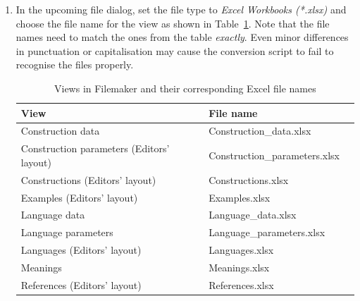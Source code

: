 \documentclass[12pt,a4paper]{scrartcl}
\begin{document}
\begin{enumerate}
    \newpage
  \item
    In the upcoming file dialog, set the file type to \emph{Excel Workbooks
    (*.xlsx)} and choose the file name for the view as shown in
    Table~\ref{tab:filenames}.
    Note that the file names need to match the ones from the table
    \emph{exactly}.
    Even minor differences in punctuation or capitalisation may cause the
    conversion script to fail to recognise the files properly.\\[1ex]{}

    \begin{table}[ht]
      \centering%
      \begin{tabular}{lll}
        \toprule
        View                                      & File name \\\midrule
        Construction data                         & Construction\_data.xlsx \\
        Construction parameters (Editors' layout) & Construction\_parameters.xlsx \\
        Constructions (Editors' layout)           & Constructions.xlsx \\
        Examples (Editors' layout)                & Examples.xlsx \\
        Language data                             & Language\_data.xlsx \\
        Language parameters                       & Language\_parameters.xlsx \\
        Languages (Editors' layout)               & Languages.xlsx \\
        Meanings                                  & Meanings.xlsx \\
        References (Editors' layout)              & References.xlsx \\
        \bottomrule
      \end{tabular}
      \caption{Views in Filemaker and their corresponding Excel file names}%
      \label{tab:filenames}
    \end{table}


\end{enumerate}
\end{document}
